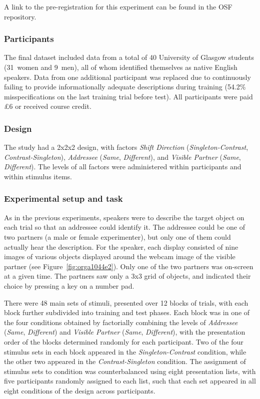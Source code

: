 \documentclass[natbib,man,a4paper]{apa6}
\begin{document}
A link to the pre-registration for this experiment can be found in the OSF repository.

\subsubsection*{Participants}
\label{sec:org28958c7}

The final dataset included data from a total of 40 University of Glasgow students (31~women and 9~men), all of whom identified themselves as native English speakers. Data from one additional participant was replaced due to continuously failing to provide informationally adequate descriptions during training (54.2\% misspecifications on the last training trial before test). All participants were paid £6 or received course credit.

\subsubsection*{Design}
\label{sec:org1dbd47a}

The study had a 2x2x2 design, with factors \emph{Shift Direction} (\emph{Singleton-Contrast}, \emph{Contrast-Singleton}), \emph{Addressee} (\emph{Same}, \emph{Different}), and \emph{Visible Partner} (\emph{Same}, \emph{Different}). The levels of all factors were administered within participants and within stimulus items.

\subsubsection*{Experimental setup and task}
\label{sec:orgf6db737}

As in the previous experiments, speakers were to describe the target object on each trial so that an addressee could identify it. The addressee could be one of two partners (a male or female experimenter), but only one of them could actually hear the description. For the speaker, each display consisted of nine images of various objects displayed around the webcam image of the visible partner (see Figure~\ref{fig:orga1044e2}). Only one of the two partners was on-screen at a given time.  The partners saw only a 3x3 grid of objects, and indicated their choice by pressing a key on a number pad.

There were 48 main sets of stimuli, presented over 12 blocks of trials, with each block further subdivided into training and test phases. Each block was in one of the four conditions obtained by factorially combining the levels of \emph{Addressee} (\emph{Same}, \emph{Different}) and \emph{Visible Partner} (\emph{Same}, \emph{Different}), with the presentation order of the blocks determined randomly for each participant.  Two of the four stimulus sets in each block appeared in the \emph{Singleton-Contrast} condition, while the other two appeared in the \emph{Contrast-Singleton} condition.  The assignment of stimulus sets to condition was counterbalanced using eight presentation lists, with five participants randomly assigned to each list, such that each set appeared in all eight conditions of the design across participants.
\end{document}
